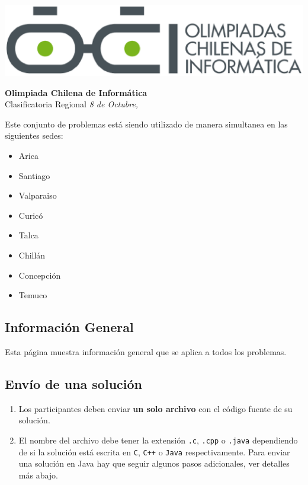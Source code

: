 \documentclass[12pt]{oci}
\begin{document}
\begin{titlingpage}
  \begin{center}
  \includegraphics[scale=0.6]{logo.eps}

  \vskip 70pt
  \Large{\bf Olimpiada Chilena de Informática\\ \the\year}
  \vskip 10pt
  \large{Clasificatoria Regional}
  \vskip 10pt
  \normalsize{\it 8 de Octubre, \the\year}


  \vskip 95pt

  \end{center}
  Este conjunto de problemas está siendo utilizado de manera simultanea en las siguientes sedes:

  \begin{itemize}[leftmargin=*]
  \item Arica
  \item Santiago
  \item Valparaiso
  \item Curicó
  \item Talca
  \item Chillán
  \item Concepción
  \item Temuco
  \end{itemize}
\end{titlingpage}

\cleardoublepage

\subsection*{Información General}

Esta página muestra información general que se aplica a todos los problemas.

\subsection*{Envío de una solución}

\begin{enumerate}
\item Los participantes deben enviar {\bf un solo archivo} con el código fuente de su solución.
\item El nombre del archivo debe tener la extensión \verb+.c+, \verb+.cpp+ o
  \verb+.java+ dependiendo de si la solución está escrita en \verb|C|,
  \verb|C++| o \verb|Java| respectivamente.
Para enviar una solución en Java hay que seguir algunos pasos adicionales, ver detalles más abajo.
\end{enumerate}
\end{document}
